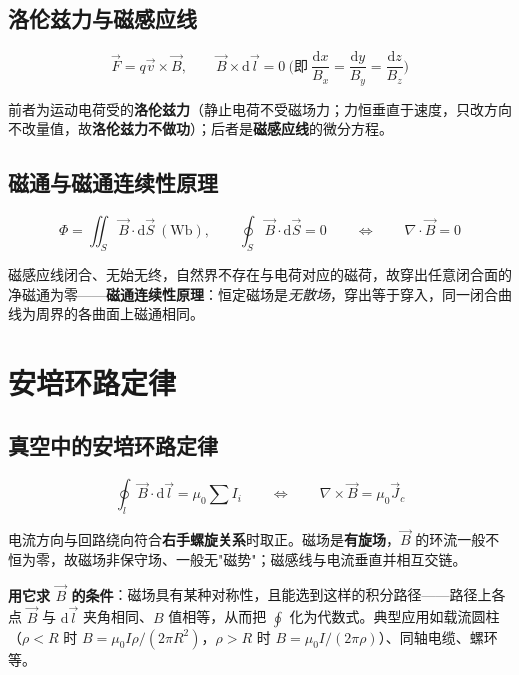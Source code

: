 \subsection{洛伦兹力与磁感应线}
\begin{formulaBox}
\[
\vec{F}=q\vec{v}\times\vec{B},
\qquad
\vec{B}\times\mathrm{d}\vec{l}=0
\ \Big(\text{即}\ \frac{\mathrm{d}x}{B_x}=\frac{\mathrm{d}y}{B_y}=\frac{\mathrm{d}z}{B_z}\Big)
\]
\end{formulaBox}
前者为运动电荷受的\textbf{洛伦兹力}（静止电荷不受磁场力；力恒垂直于速度，只改方向不改量值，故\textbf{洛伦兹力不做功}）；后者是\textbf{磁感应线}的微分方程。

\subsection{磁通与磁通连续性原理}
\begin{formulaBox}
\[
\Phi=\iint_S \vec{B}\cdot\mathrm{d}\vec{S}\ (\mathrm{Wb}),
\qquad
\oint_S \vec{B}\cdot\mathrm{d}\vec{S}=0
\qquad\Longleftrightarrow\qquad
\nabla\cdot\vec{B}=0
\]
\end{formulaBox}
磁感应线闭合、无始无终，自然界不存在与电荷对应的磁荷，故穿出任意闭合面的净磁通为零——\textbf{磁通连续性原理}：恒定磁场是\emph{无散场}，穿出等于穿入，同一闭合曲线为周界的各曲面上磁通相同。


\section{安培环路定律}

\subsection{真空中的安培环路定律}
\begin{formulaBox}
\[
\oint_l \vec{B}\cdot\mathrm{d}\vec{l}=\mu_0\sum I_i
\qquad\Longleftrightarrow\qquad
\nabla\times\vec{B}=\mu_0\vec{J}_c
\]
\end{formulaBox}
电流方向与回路绕向符合\textbf{右手螺旋关系}时取正。磁场是\textbf{有旋场}，$\vec{B}$ 的环流一般不恒为零，故磁场非保守场、一般无"磁势"；磁感线与电流垂直并相互交链。

\textbf{用它求 $\vec{B}$ 的条件}：磁场具有某种对称性，且能选到这样的积分路径——路径上各点 $\vec{B}$ 与 $\mathrm{d}\vec{l}$ 夹角相同、$B$ 值相等，从而把 $\oint$ 化为代数式。典型应用如载流圆柱（$\rho<R$ 时 $B=\mu_0I\rho/(2\pi R^2)$，$\rho>R$ 时 $B=\mu_0I/(2\pi\rho)$）、同轴电缆、螺环等。

